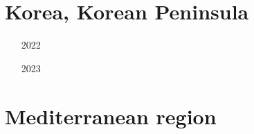 \section{Korea, Korean Peninsula} 

\begin{small}
\begin{itemize}
\item[2022]
\item[2023]
\end{itemize}
\end{small}




\section{Mediterranean region}

